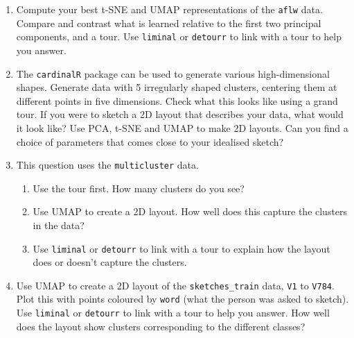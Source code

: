 \documentclass[
  letterpaper,
]{krantz}
\providecommand{\tightlist}{%
  \setlength{\itemsep}{0pt}\setlength{\parskip}{0pt}}
\begin{document}
\begin{enumerate}
  \begin{enumerate}
  \def\labelenumii{\alph{enumii}.}
  \tightlist
  \item
    Generate a 2D representation using t-SNE. Plot the points mapping
    the colour to species. What is most surprising? (Hint: Are the three
    species represented by three distinct clusters?)
  \item
    Re-do the t-SNE representation with different parameter choices,
    including using different random seeds. Are the results different
    each time, or do you think that they could be considered to be
    equivalent?
  \item
    Use \texttt{liminal} or \texttt{detourr} to link the t-SNE
    representation to a tour of the penguins. Highlight the points that
    have been placed in an awkward position by t-SNE from others in
    their species. Watch them relative to the others in their species in
    the tour view, and think about whether there is any rationale for
    the awkward placement.
  \item
    Try again using UMAP to make the 2D representation, and use
    \texttt{liminal} or \texttt{detourr} to link with a tour to explore
    the result.
  \end{enumerate}
\item
  Compute your best t-SNE and UMAP representations of the \texttt{aflw}
  data. Compare and contrast what is learned relative to the first two
  principal components, and a tour. Use \texttt{liminal} or
  \texttt{detourr} to link with a tour to help you answer.
\item
  The \texttt{cardinalR} package can be used to generate various
  high-dimensional shapes. Generate data with 5 irregularly shaped
  clusters, centering them at different points in five dimensions. Check
  what this looks like using a grand tour. If you were to sketch a 2D
  layout that describes your data, what would it look like? Use PCA,
  t-SNE and UMAP to make 2D layouts. Can you find a choice of parameters
  that comes close to your idealised sketch?
\item
  This question uses the \texttt{multicluster} data.

  \begin{enumerate}
  \def\labelenumii{\alph{enumii}.}
  \tightlist
  \item
    Use the tour first. How many clusters do you see?
  \item
    Use UMAP to create a 2D layout. How well does this capture the
    clusters in the data?
  \item
    Use \texttt{liminal} or \texttt{detourr} to link with a tour to
    explain how the layout does or doesn't capture the clusters.
  \end{enumerate}
\item
  Use UMAP to create a 2D layout of the \texttt{sketches\_train} data,
  \texttt{V1} to \texttt{V784}. Plot this with points coloured by
  \texttt{word} (what the person was asked to sketch). Use
  \texttt{liminal} or \texttt{detourr} to link with a tour to help you
  answer. How well does the layout show clusters corresponding to the
  different classes?
\end{enumerate}
\end{document}
